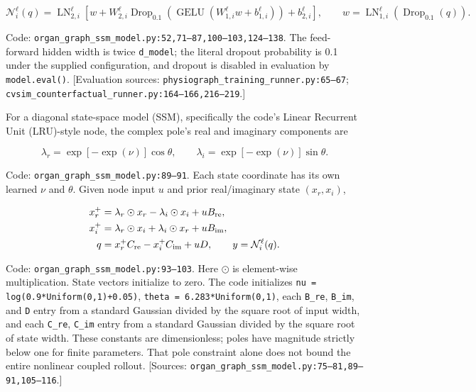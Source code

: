 \[
\mathcal N_i^\ell(q)=\operatorname{LN}_{2,i}^\ell\!\left[
 w+W_{2,i}^\ell\operatorname{Drop}_{0.1}\!\left(\operatorname{GELU}(W_{1,i}^\ell w+b_{1,i}^\ell)\right)+b_{2,i}^\ell\right],
\qquad w=\operatorname{LN}_{1,i}^\ell(\operatorname{Drop}_{0.1}(q)).
\]


Code: \texttt{organ\_\allowbreak{}graph\_\allowbreak{}ssm\_\allowbreak{}model.\allowbreak{}py:\allowbreak{}52,\allowbreak{}71–\allowbreak{}87,\allowbreak{}100–\allowbreak{}103,\allowbreak{}124–\allowbreak{}138}. The feed-forward hidden width is twice \texttt{d\_\allowbreak{}model}; the literal dropout probability is 0.1 under the supplied configuration, and dropout is disabled in evaluation by \texttt{model.\allowbreak{}eval()}. [Evaluation sources: \texttt{physiograph\_\allowbreak{}training\_\allowbreak{}runner.\allowbreak{}py:\allowbreak{}65–\allowbreak{}67}; \texttt{cvsim\_\allowbreak{}counterfactual\_\allowbreak{}runner.\allowbreak{}py:\allowbreak{}164–\allowbreak{}166,\allowbreak{}216–\allowbreak{}219}.]

For a diagonal state-space model (SSM), specifically the code's Linear Recurrent Unit (LRU)-style node, the complex pole's real and imaginary components are

\[
\lambda_r=\exp[-\exp(\nu)]\cos\theta,\qquad
\lambda_i=\exp[-\exp(\nu)]\sin\theta.
\]


Code: \texttt{organ\_\allowbreak{}graph\_\allowbreak{}ssm\_\allowbreak{}model.\allowbreak{}py:\allowbreak{}89–\allowbreak{}91}. Each state coordinate has its own learned \(\nu\) and \(\theta\). Given node input \(u\) and prior real/imaginary state \((x_r,x_i)\),

\[
\begin{aligned}
x_r^+&=\lambda_r\odot x_r-\lambda_i\odot x_i+uB_{\rm re},\\
x_i^+&=\lambda_r\odot x_i+\lambda_i\odot x_r+uB_{\rm im},\\
q&=x_r^+ C_{\rm re}-x_i^+ C_{\rm im}+uD,\qquad y=\mathcal N_i^\ell(q).
\end{aligned}
\]


Code: \texttt{organ\_\allowbreak{}graph\_\allowbreak{}ssm\_\allowbreak{}model.\allowbreak{}py:\allowbreak{}93–\allowbreak{}103}. Here \(\odot\) is element-wise multiplication. State vectors initialize to zero. The code initializes \texttt{nu =\allowbreak{} log(0.\allowbreak{}9*Uniform(0,\allowbreak{}1)+0.\allowbreak{}05)}, \texttt{theta =\allowbreak{} 6.\allowbreak{}283*Uniform(0,\allowbreak{}1)}, each \texttt{B\_\allowbreak{}re}, \texttt{B\_\allowbreak{}im}, and \texttt{D} entry from a standard Gaussian divided by the square root of input width, and each \texttt{C\_\allowbreak{}re}, \texttt{C\_\allowbreak{}im} entry from a standard Gaussian divided by the square root of state width. These constants are dimensionless; poles have magnitude strictly below one for finite parameters. That pole constraint alone does not bound the entire nonlinear coupled rollout. [Sources: \texttt{organ\_\allowbreak{}graph\_\allowbreak{}ssm\_\allowbreak{}model.\allowbreak{}py:\allowbreak{}75–\allowbreak{}81,\allowbreak{}89–\allowbreak{}91,\allowbreak{}105–\allowbreak{}116}.]

